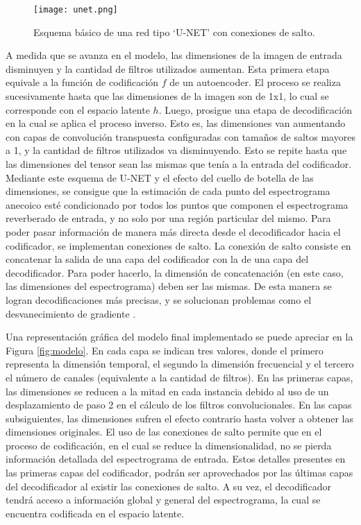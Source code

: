 \begin{figure}[H]
	\centering{}
	\texttt{[image: unet.png]}
	\caption{Esquema básico de una red tipo `U-NET' con conexiones de salto.}
	\label{fig:unet}
\end{figure}

A medida que se avanza en el modelo, las dimensiones de la imagen de entrada disminuyen y la cantidad de filtros utilizados aumentan. Esta primera etapa equivale a la función de codificación $f$ de un autoencoder. El proceso se realiza sucesivamente hasta que las dimensiones de la imagen son de 1x1, lo cual se corresponde con el espacio latente $h$. Luego, prosigue una etapa de decodificación en la cual se aplica el proceso inverso. Esto es, las dimensiones van aumentando con capas de convolución transpuesta configuradas con tamaños de saltos mayores a 1, y la cantidad de filtros utilizados va disminuyendo. Esto se repite hasta que las dimensiones del tensor sean las mismas que tenía a la entrada del codificador. Mediante este esquema de U-NET y el efecto del cuello de botella de las dimensiones, se consigue que la estimación de cada punto del espectrograma anecoico esté condicionado por todos los puntos que componen el espectrograma reverberado de entrada, y no solo por una región particular del mismo. Para poder pasar información de manera más directa desde el decodificador hacia el codificador, se implementan conexiones de salto. La conexión de salto consiste en concatenar la salida de una capa del codificador con la de una capa del decodificador. Para poder hacerlo, la dimensión de concatenación (en este caso, las dimensiones del espectrograma) deben ser las mismas. De esta manera se logran decodificaciones más precisas, y se solucionan problemas como el desvanecimiento de gradiente \cite{lagartija}. 

Una representación gráfica del modelo final implementado se puede apreciar en la Figura \ref{fig:modelo}. En cada capa se indican tres valores, donde el primero representa la dimensión temporal, el segundo la dimensión frecuencial y el tercero el número de canales (equivalente a la cantidad de filtros). En las primeras capas, las dimensiones se reducen a la mitad en cada instancia debido al uso de un desplazamiento de paso 2 en el cálculo de los filtros convolucionales. En las capas subsiguientes, las dimensiones sufren el efecto contrario hasta volver a obtener las dimensiones originales. El uso de las conexiones de salto permite que en el proceso de codificación, en el cual se reduce la dimensionalidad, no se pierda información detallada del espectrograma de entrada. Estos detalles presentes en las primeras capas del codificador, podrán ser aprovechados por las últimas capas del decodificador al existir las conexiones de salto. A su vez, el decodificador tendrá acceso a información global y general del espectrograma, la cual se encuentra codificada en el espacio latente.

